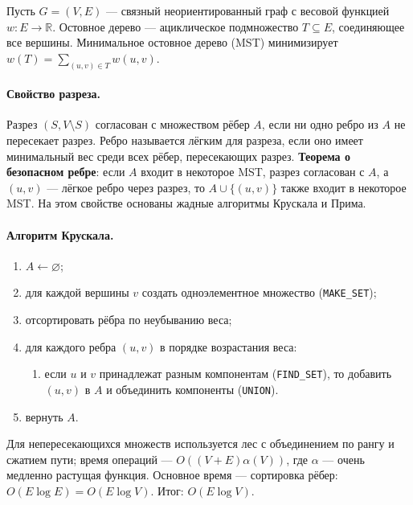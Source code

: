 \documentclass[a4paper,12pt]{article}
\begin{document}
Пусть \(G=(V,E)\) — связный неориентированный граф с весовой функцией \(w:E\to\mathbb{R}\). Остовное дерево — ациклическое подмножество \(T\subseteq E\), соединяющее все вершины. Минимальное остовное дерево (MST) минимизирует \(w(T)=\sum_{(u,v)\in T}w(u,v)\).

\paragraph*{Свойство разреза.}
Разрез \((S,V\setminus S)\) согласован с множеством рёбер \(A\), если ни одно ребро из \(A\) не пересекает разрез. Ребро называется лёгким для разреза, если оно имеет минимальный вес среди всех рёбер, пересекающих разрез. \textbf{Теорема о безопасном ребре}: если \(A\) входит в некоторое MST, разрез согласован с \(A\), а \((u,v)\) — лёгкое ребро через разрез, то \(A\cup\{(u,v)\}\) также входит в некоторое MST. На этом свойстве основаны жадные алгоритмы Крускала и Прима.

\paragraph*{Алгоритм Крускала.}
\begin{enumerate}
    \item \(A\leftarrow\varnothing\);
    \item для каждой вершины \(v\) создать одноэлементное множество (\texttt{MAKE\_SET});
    \item отсортировать рёбра по неубыванию веса;
    \item для каждого ребра \((u,v)\) в порядке возрастания веса:
    \begin{enumerate}
        \item если \(u\) и \(v\) принадлежат разным компонентам (\texttt{FIND\_SET}), то добавить \((u,v)\) в \(A\) и объединить компоненты (\texttt{UNION}).
    \end{enumerate}
    \item вернуть \(A\).
\end{enumerate}
Для непересекающихся множеств используется лес с объединением по рангу и сжатием пути; время операций — \(O((V+E)\alpha(V))\), где \(\alpha\) — очень медленно растущая функция. Основное время — сортировка рёбер: \(O(E\log E)=O(E\log V)\). Итог: \(O(E\log V)\).
\end{document}
